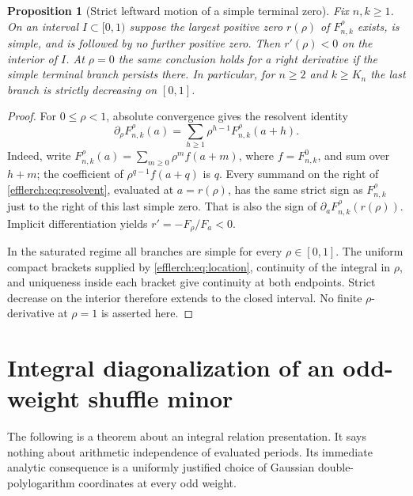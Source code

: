 \documentclass[11pt,letterpaper]{article}
\newtheorem{proposition}[theorem]{Proposition}
\theoremstyle{definition}
\theoremstyle{remark}
\begin{document}
\begin{proposition}[Strict leftward motion of a simple terminal zero]
\label{efflerch:prop:terminal}
Fix $n,k\geq1$.  On an interval $I\subset[0,1)$ suppose the largest
positive zero $r(\rho)$ of $F_{n,k}^\rho$ exists, is simple, and is
followed by no further positive zero.  Then $r'(\rho)<0$ on the interior
of $I$.  At $\rho=0$ the same conclusion holds for a right derivative
if the simple terminal branch persists there.  In particular, for
$n\geq2$ and $k\geq K_n$ the last branch is strictly decreasing on $[0,1]$.
\end{proposition}
\begin{proof}
For $0\leq\rho<1$, absolute convergence gives the resolvent identity
\begin{equation}\label{efflerch:eq:resolvent}
 \partial_\rho F_{n,k}^\rho(a)
  =\sum_{h\geq1}\rho^{h-1}F_{n,k}^\rho(a+h).
\end{equation}
Indeed, write $F_{n,k}^\rho(a)=\sum_{m\geq0}\rho^m f(a+m)$,
where $f=F_{n,k}^0$, and sum over $h+m$; the coefficient of
$\rho^{q-1}f(a+q)$ is $q$.  Every summand on the right of
\eqref{efflerch:eq:resolvent}, evaluated at $a=r(\rho)$, has the
same strict sign as $F_{n,k}^\rho$ just to the right of this last
simple zero.  That is also the sign of $\partial_aF_{n,k}^\rho(r(\rho))$.
Implicit differentiation yields $r'=-F_\rho/F_a<0$.

In the saturated regime all branches are simple for every
$\rho\in[0,1]$.  The uniform compact brackets supplied by
\eqref{efflerch:eq:location}, continuity of the integral in $\rho$,
and uniqueness inside each bracket give continuity at both endpoints.
Strict decrease on the interior therefore extends to the closed interval.
No finite $\rho$-derivative at $\rho=1$ is asserted here.
\end{proof}



\section{Integral diagonalization of an odd-weight shuffle minor}
\label{oi:sec:shuffle}

The following is a theorem about an integral relation presentation.
It says nothing about arithmetic independence of evaluated periods.
Its immediate analytic consequence is a uniformly justified choice of
Gaussian double-polylogarithm coordinates at every odd weight.
\end{document}
